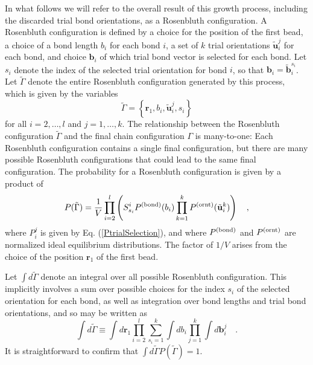 \documentclass[12pt]{article} %
\newcommand{\vv}[1]{\mathbf{#1}}
\newcommand\chain{\Gamma}
\newcommand\vbead{\vv{r}}
\newcommand\qbead{\vv{r}_{1}}
\newcommand\nbead{l}
\newcommand\vbond{\vv{b}}
\newcommand\rbond{b}
\newcommand\ntrial{k}
\newcommand\vtrial{\tilde{\vv{b}}}
\newcommand\utrial{\tilde{\vv{u}}}
\newcommand\Pbond{P^{({\rm bond})}}
\newcommand\Pornt{P^{({\rm ornt})}}
\newcommand\rconfig{\tilde{\chain}}
\begin{document}
In what follows we will refer to the overall result of this growth process, 
including the discarded trial bond orientations, as a Rosenbluth configuration. A 
Rosenbluth configuration is defined by a choice for the position of the first bead, 
a choice of a bond length $b_{i}$ for each bond $i$, a set of $\ntrial$ trial 
orientations $\utrial_{i}^{j}$ for each bond, and choice $\vbond_{i}$ of which 
trial bond vector is selected for each bond.  Let $s_{i}$ denote the index of 
the selected trial orientation for bond $i$, so that 
$\vbond_{i} = \vtrial_{i}^{s_{i}}$.  Let $\rconfig$ denote the entire Rosenbluth 
configuration generated by this process, which is given by the variables
\begin{equation}
   \rconfig = \left \{ \vbead_{1},\rbond_{i},\utrial_{i}^{j},s_{i} \right \}
\end{equation}
for all $i=2,\ldots,\nbead$ and $j=1,\ldots,\ntrial$. The relationship between 
the Rosenbluth configuration $\rconfig$ and the final chain configuration $\chain$ 
is many-to-one: Each Rosenbluth configuration contains a single final configuration, 
but there are many possible Rosenbluth configurations that could lead to the same 
final configuration.  The probability for a Rosenbluth configuration is given by 
a product of
\begin{equation}
   P(\rconfig) = \frac{1}{V}
                 \prod_{i=2}^{\nbead} \left (
                 S_{s_{i}}^{i}
                 \Pbond(\rbond_{i})
                 \prod_{k=1}^{\ntrial}
                 \Pornt(\utrial_{i}^{k}) \right )
   \quad,
\end{equation}
where $P_{i}^{j}$ is given by Eq. (\ref{PtrialSelection}), and where $\Pbond$
and $\Pornt$ are normalized ideal equilibrium distributions.  The factor of 
$1/V$ arises from the choice of the position $\vbead_{1}$ of the first bead. 

Let $\int d\rconfig$ denote an integral over all possible Rosenbluth configuration. 
This implicitly involves a sum over possible choices for the index $s_{i}$ of the 
selected orientation for each bond, as well as integration over bond lengths and 
trial bond orientations, and so may be written as
\begin{equation}
    \int d\rconfig \equiv 
                   \int d\qbead
                   \prod_{i=2}^{\nbead} 
                   \sum_{s_{i}=1}^{\ntrial} 
                   \int d\rbond_{i}
                   \prod_{j=1}^{\ntrial}
                   \int d\vbond_{i}^{j}
                   \quad.
\end{equation}
It is straightforward to confirm that $\int d\rconfig P(\rconfig) = 1$.
\end{document}
